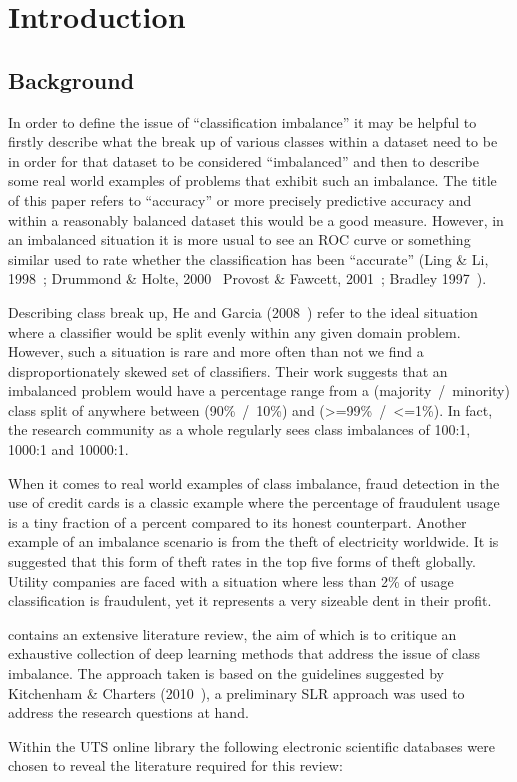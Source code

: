 \chapter{Introduction}\label{ch:Intro}

\section{Background}\label{sec:Background} 
In order to define the issue of ``classification imbalance'' it may be helpful to firstly describe what the break up of various classes within a dataset need to be in order for that dataset to be considered ``imbalanced'' and then to describe some real world examples of problems that exhibit such an imbalance. The title of this paper refers to ``accuracy'' or more precisely predictive accuracy and within a reasonably balanced dataset this would be a good measure. However, in an imbalanced situation it is more usual to see an ROC curve or something similar used to rate whether the classification has been ``accurate'' (Ling \& Li, 1998~\cite{ling1998data}; Drummond \& Holte, 2000~\cite{drummond2000explicitly} Provost \& Fawcett, 2001~\cite{provost2001robust}; Bradley 1997~\cite{bradley1997use}).  
\par
Describing class break up, He and Garcia (2008~\cite{he2008learning}) refer to the ideal situation where a classifier would be split evenly within any given domain problem. However, such a situation is rare and more often than not we find a disproportionately skewed set of classifiers. Their work suggests that an imbalanced problem would have a percentage range from a (majority~/~minority) class split of anywhere between (90\%~/~10\%) and (\textgreater=99\%~/~\textless=1\%). In fact, the research community as a whole regularly sees class imbalances of 100:1, 1000:1 and 10000:1. 
\par
When it comes to real world examples of class imbalance, fraud detection in the use of credit cards is a classic example where the percentage of fraudulent usage is a tiny fraction of a percent compared to its honest counterpart. Another example of an imbalance scenario is from the theft of electricity worldwide. It is suggested that this form of theft rates in the top five forms of theft globally. Utility companies are faced with a situation where less than 2\% of usage classification is fraudulent, yet it represents a very sizeable dent in their profit.
\par
{} contains an extensive literature review, the aim of which is to critique an exhaustive collection of deep learning methods that address the issue of class imbalance. The approach taken is based on the guidelines suggested by Kitchenham \& Charters (2010~\cite{Kitchenham2010}), a preliminary SLR approach was used to address the research questions at hand.
\par
Within the UTS online library the following electronic scientific databases were chosen to reveal the literature required for this review:

